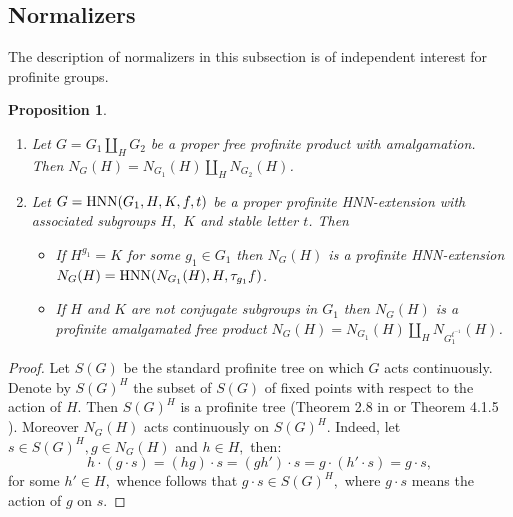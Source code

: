 \documentclass[a4paper,12pt]{article}
\newtheorem{lem}[thm]{Lemma}
\newtheorem{prop}[thm]{Proposition}
\def\hnn {{\rm HNN}}
\begin{document}
{%





\subsection{Normalizers}\label{normalizers}

The  description of   normalizers in this subsection is of independent interest for profinite groups.

\begin{prop} \label{normalizer}
\begin{enumerate}
\item[(i)] Let $G=G_1\amalg_H G_2$ be a proper  free profinite product with  amalgamation. Then $N_G(H)=N_{G_1}(H)\amalg_H N_{G_2}(H)$.
\item[(ii)] Let $G=\hnn(G_1, H, K, f, t)$ be a proper profinite HNN-extension with associated subgroups $H,$ $K$ and stable letter $t$. Then  
\begin{itemize}

\item[(a)]  If $H^{g_1}=K$ for some $g_1 \in G_1$ then $N_{G}(H)$ is a profinite HNN-extension  $N_{G}(H)=\hnn(N_{G_1}(H), H, \tau_{g_1} f)$. 

\item[(b)] If $H$ and $K$ are not conjugate subgroups in $G_1$ then $N_{G}(H)$ is a profinite amalgamated free product  $N_{G}(H)=N_{G_1}(H)\amalg_{H} N_{G_1^{t^{-1}}}(H)$. 
\end{itemize}

\end{enumerate}
\end{prop}

\begin{proof} %
Let $S(G)$ be the standard profinite tree on which $G$ acts continuously. Denote by $S(G)^{H}$ the subset of $S(G)$ of  fixed points with respect to the action of $H$. Then $S(G)^{H}$ is a profinite tree (Theorem 2.8 in \cite{ZM1} or Theorem 4.1.5 \cite{R}). Moreover $N_{G}(H)$ acts continuously on $S(G)^{H}$. Indeed, let $s \in S(G)^{H}, g \in N_{G}(H)$ and $h \in H,$ then: $$h\cdot(g\cdot s)=(hg)\cdot s=(gh')\cdot s = g\cdot (h'\cdot s)=g\cdot s,$$ for some $h'\in H,$  whence follows that $g\cdot s \in S(G)^{H},$ where $g\cdot s$ means the action of $g$ on $s$. 


\end{proof}}
\end{document}
